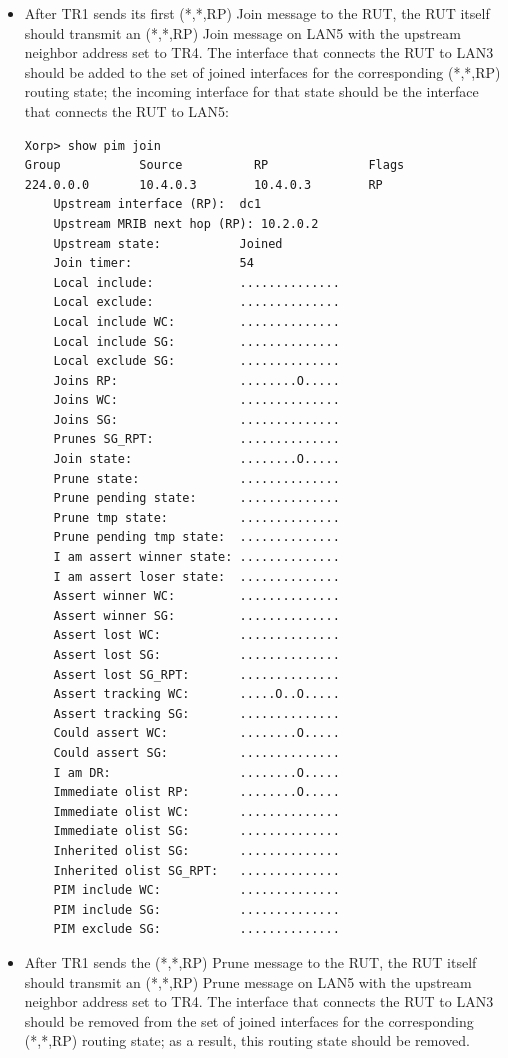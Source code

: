 \documentclass[11pt]{report}
\begin{document}
\begin{itemize}

  \item After TR1 sends its first (*,*,RP) Join message to the RUT, the RUT
  itself should transmit an (*,*,RP) Join message on LAN5 with the upstream
  neighbor address set to TR4. The interface that connects the RUT to LAN3
  should be added to the set of joined interfaces for the corresponding
  (*,*,RP) routing state; the incoming interface for that state should be the
  interface that connects the RUT to LAN5:

\begin{verbatim}
Xorp> show pim join 
Group           Source          RP              Flags
224.0.0.0       10.4.0.3        10.4.0.3        RP   
    Upstream interface (RP):  dc1
    Upstream MRIB next hop (RP): 10.2.0.2
    Upstream state:           Joined 
    Join timer:               54
    Local include:            ..............
    Local exclude:            ..............
    Local include WC:         ..............
    Local include SG:         ..............
    Local exclude SG:         ..............
    Joins RP:                 ........O.....
    Joins WC:                 ..............
    Joins SG:                 ..............
    Prunes SG_RPT:            ..............
    Join state:               ........O.....
    Prune state:              ..............
    Prune pending state:      ..............
    Prune tmp state:          ..............
    Prune pending tmp state:  ..............
    I am assert winner state: ..............
    I am assert loser state:  ..............
    Assert winner WC:         ..............
    Assert winner SG:         ..............
    Assert lost WC:           ..............
    Assert lost SG:           ..............
    Assert lost SG_RPT:       ..............
    Assert tracking WC:       .....O..O.....
    Assert tracking SG:       ..............
    Could assert WC:          ........O.....
    Could assert SG:          ..............
    I am DR:                  ........O.....
    Immediate olist RP:       ........O.....
    Immediate olist WC:       ..............
    Immediate olist SG:       ..............
    Inherited olist SG:       ..............
    Inherited olist SG_RPT:   ..............
    PIM include WC:           ..............
    PIM include SG:           ..............
    PIM exclude SG:           ..............
\end{verbatim}

  \item After TR1 sends the (*,*,RP) Prune message to the RUT, the RUT itself
  should transmit an (*,*,RP) Prune message on LAN5 with the upstream neighbor
  address set to TR4. The interface that connects the RUT to LAN3 should be
  removed from the set of joined interfaces for the corresponding (*,*,RP)
  routing state; as a result, this routing state should be removed.


\end{itemize}
\end{document}
